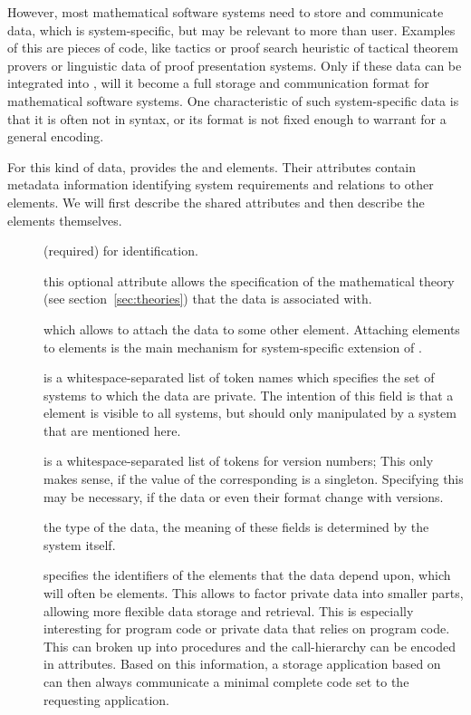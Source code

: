 However, most mathematical software systems need to store and communicate data,
which is system-specific, but may be relevant to more than user. Examples of this
are pieces of {} code, like tactics or proof search heuristic of
tactical theorem provers or linguistic data of proof presentation systems. Only if
these data can be integrated into {\omdoc}, will it become a full storage and
communication format for mathematical software systems. One characteristic of such
system-specific data is that it is often not in {\xml} syntax, or its
format is  not  fixed enough to warrant for a general {\xml} encoding. 

For this kind of data, {\omdoc} provides the {} and
{} elements. Their attributes contain metadata information
identifying system requirements and relations to other {\omdoc} elements. We will
first describe the shared attributes and then describe the elements themselves.
\begin{description}
\item[{}] (required) for identification.
\item[{}] this optional attribute allows the
  specification of the mathematical theory (see section~\ref{sec:theories}) that
  the data is associated with.
\item[{}] which allows to attach the data to some
  other {\omdoc} element. Attaching {} elements to {\omdoc}
  elements is the main mechanism for system-specific extension of {\omdoc}.
\item[{}] is a whitespace-separated list of token names
  which specifies the set of systems to which the data are private. The intention
  of this field is that a {} element is visible to all systems,
  but should only manipulated by a system that are mentioned here.
\item[{}] is a whitespace-separated list of tokens
  for version numbers; This only makes sense, if the value of the corresponding
  {} is a singleton. Specifying this may be necessary, if
  the data or even their format change with versions.
\item[{}] the type of the data, the meaning of these
  fields is determined by the system itself. 
\item[{}] specifies the identifiers of the
  elements that the data depend upon, which will often be {}
  elements. This allows to factor private data into smaller parts, allowing more
  flexible data storage and retrieval. This is especially interesting for program
  code or private data that relies on program code. This can broken up into
  procedures and the call-hierarchy can be encoded in
  {} attributes. Based on this information, a
  storage application based on {\omdoc} can then always communicate a minimal
  complete code set to the requesting application.
\end{description}


